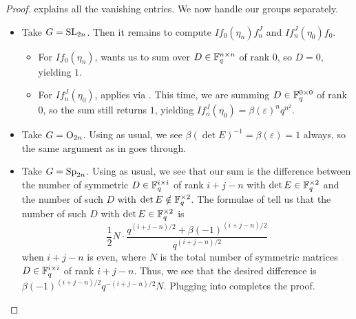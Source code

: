 \begin{proof}
     explains all the vanishing entries. We now handle our groups separately.
    \begin{itemize}
        \item Take $G=\mathrm{SL}_{2n}$. Then it remains to compute $If_0(\eta_n)f_n^J$ and $If_n^J(\eta_0)f_0$.
    	\begin{itemize}
    		\item For $If_0(\eta_n)$,  wants us to sum over $D\in\mathbb F_q^{n\times n}$ of rank $0$, so $D=0$, yielding $1$.
    		\item For $If_n^J(\eta_0)$,  applies via  . This time, we are summing $D\in\mathbb F_q^{0\times0}$ of rank $0$, so the sum still returns $1$, yielding $If_n^J(\eta_0)=\beta(\varepsilon)^nq^{n^2}$.
    	\end{itemize}
        \item Take $G=\mathrm{O}_{2n}$. Using  as usual, we see $\beta(\det E)^{-1}=\beta(\varepsilon)=1$ always, so the same argument as in  goes through.
        \item Take $G=\mathrm{Sp}_{2n}$. Using  as usual, we see that our sum is the difference between the number of symmetric $D\in\mathbb F_q^{i\times i}$ of rank $i+j-n$ with $\det E\in\mathbb F_q^{\times2}$ and the number of such $D$ with $\det E\notin\mathbb F_q^{\times2}$. The formulae of \cite{macwilliams-ortho-matrices} tell us that the number of such $D$ with $\det E\in\mathbb F_q^{\times2}$ is
        \[\frac12N\cdot\frac{q^{(i+j-n)/2}+\beta(-1)^{(i+j-n)/2}}{q^{(i+j-n)/2}}\]
        when $i+j-n$ is even,
    	where $N$ is the total number of symmetric matrices $D\in\mathbb F_q^{i\times i}$ of rank $i+j-n$. Thus, we see that the desired difference is $\beta(-1)^{(i+j-n)/2}q^{-(i+j-n)/2}N$. Plugging into  completes the proof.
        \qedhere
    \end{itemize}
\end{proof}
